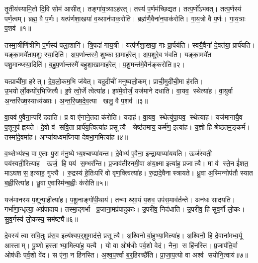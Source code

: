 \clearpage
{}
\setcounter{anuvakam}{0}
तृ॒तीय॑स्यामि॒तो दि॒वि सोम॑ आसीत्। तङ्गा॑य॒त्र्याऽह॑रत्। तस्य॑ प॒र्णम॑च्छिद्यत। तत्प॒र्णो॑ऽभवत्। तत्प॒र्णस्य॑ पर्ण॒त्वम्। ब्रह्म॒ वै प॒र्णः। यत्प॑र्णशा॒खया॑ व॒थ्सान॑पाक॒रोति॑। ब्रह्म॑णै॒वैना॑न॒पाक॑रोति। गा॒य॒त्रो वै प॒र्णः। गा॒य॒त्राः प॒शव॑॥१॥

तस्मा॒त्रीणि॑त्रीणि प॒र्णस्य॑ पला॒शानि॑। त्रि॒पदा॑ गाय॒त्री। यत्प॑र्णशा॒खया॒ गाः प्रा॒र्पय॑ति। स्वयै॒वैना॑ दे॒वत॑या॒ प्रार्प॑यति। यङ्का॒मये॑ताप॒शुः स्या॒दिति॑। अ॒प॒र्णान्तस्मै॒ शुष्काग्रा॒माह॑रेत्। अ॒प॒शुरे॒व भ॑वति। यङ्का॒मये॑त पशु॒मान्थ्स्या॒दिति॑। ब॒हु॒प॒र्णान्तस्मै॑ बहुशा॒खामाह॑रेत्। प॒शु॒मन्त॑मे॒वैन॑ङ्करोति॥२।

यत्प्राची॑मा॒ हरेत्। दे॒व॒लो॒कम॒भि ज॑येत्। यदुदी॑चीं मनुष्यलो॒कम्। प्राची॒मुदी॑ची॒मा ह॑रति। उ॒भयोर्लो॒कयो॑र॒भिजि॑त्यै। इ॒षे त्वो॒र्जे त्वेत्या॑ह। इष॑मे॒वोर्जं॒ यज॑माने दधाति। वा॒यव॒ स्थेत्या॑ह। वा॒युर्वा अ॒न्तरि॑ख्ष॒स्याध्य॑ख्षाः। अ॒न्त॒रि॒ख्ष॒दे॒व॒त्या खलु॒ वै प॒शव॑॥३॥

वा॒यव॑ ए॒वैना॒न्परि॑ ददाति। प्र वा ए॑नाने॒तदा क॑रोति। यदाह॑। वा॒यव॒ स्थेत्यु॑पा॒यव॒ स्थेत्या॑ह। यज॑मानायै॒व प॒शूनुप॑ ह्वयते। दे॒वो व॑ सवि॒ता प्रार्प॑य॒त्वित्या॑ह॒ प्रसूत्यै। श्रेष्ठ॑तमाय॒ कर्म॑ण॒ इत्या॑ह। य॒ज्ञो हि श्रेष्ठ॑तम॒ङ्कर्म॑। तस्मा॑दे॒वमा॑ह। आप्या॑यध्वमघ्निया देवभा॒गमित्या॑ह॥४॥

व॒थ्सेभ्य॑श्च॒ वा ए॒ताः पु॒रा म॑नु॒ष्येभ्य॒श्चाप्या॑यन्त। दे॒वेभ्य॑ ए॒वैना॒ इन्द्रा॒याप्या॑ययति। ऊर्ज॑स्वती॒ पय॑स्वती॒रित्या॑ह। ऊर्ज॒ हि पय॑ स॒म्भर॑न्ति। प्र॒जाव॑तीरनमी॒वा अ॑य॒क्ष्मा इत्या॑ह॒ प्रजात्यै। मा व॑ स्ते॒न ई॑शत॒ माऽघशस॒ इत्या॑ह॒ गुप्त्यै। रु॒द्रस्य॑ हे॒तिःपरि॑ वो वृण॒क्त्वित्या॑ह। रु॒द्रादे॒वैनास्त्रायते। ध्रु॒वा अ॒स्मिन्गोप॑तौ स्यात ब॒ह्वीरित्या॑ह। ध्रु॒वा ए॒वास्मि॑न्ब॒ह्वीः क॑रोति॥५॥

यज॑मानस्य प॒शून्पा॒हीत्या॑ह। प॒शू॒नाङ्गो॑पी॒थाय॑। तन्माथ्सा॒यं प॒शव॒ उप॑स॒माव॑र्तन्ते। अन॑धः सादयति। गर्भा॑णा॒न्धृत्या॒ अप्र॑पादाय। तस्मा॒द्गर्भा प्र॒जाना॒मप्र॑पादुकाः। उ॒परी॑व॒ निद॑धाति। उ॒परी॑व॒ हि सु॑व॒र्गो लो॒कः। सु॒व॒र्गस्य॑ लो॒कस्य॒ सम॑ष्ट्यै॥६॥\anuvakamend[प॒शव॑ करोति प॒शवो॑ देवभा॒गमित्या॑ह करोति॒ नव॑ च]

दे॒वस्य॑ त्वा सवि॒तुः प्र॑स॒व इत्य॑श्वप॒र्॒शुमाद॑त्ते॒ प्रसूत्यै। अ॒श्विनोर्बा॒हुभ्या॒मित्या॑ह। अ॒श्विनौ॒ हि दे॒वाना॑मध्व॒र्यू आस्ताम्। पू॒ष्णो हस्ताभ्या॒मित्या॑ह॒ यत्यै। यो वा ओष॑धीः पर्व॒शो वेद॑। नैना॒ स हि॑नस्ति। प्र॒जाप॑ति॒र्वा ओष॑धीः पर्व॒शो वे॑द। स ए॑ना॒ न हि॑नस्ति। अ॒श्व॒प॒र्श्वा ब॒र्॒हिरच्छै॑ति। प्रा॒जा॒प॒त्यो वा अश्व॑ सयोनि॒त्वाय॑॥७॥

